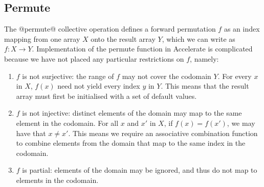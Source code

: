 

\subsection{Permute}
\label{sec:parallel_permute}

The @permute@ collective operation defines a forward permutation $f$ as an
index mapping from one array $X$ onto the result array $Y$, which we can write
as  $f : X \rightarrow Y$. Implementation of the permute function in Accelerate
is complicated because we have not placed any particular restrictions on $f$,
namely:
%
\begin{enumerate}
    \item $f$ is not surjective: the range of $f$ may not cover the codomain
        $Y$. For every $x$ in $X$, $f\left( x \right)$ need not yield every
        index $y$ in $Y$. This means that the result array must first be
        initialised with a set of default values.

    \item $f$ is not injective: distinct elements of the domain may
        map to the same element in the codomain. For all $x$ and $x'$ in $X$, if
        $f\left( x \right) = f\left( x' \right)$, we may have that $x \ne x'$.
        This means we require an associative combination function to combine
        elements from the domain that map to the same index in the codomain.

    \item $f$ is partial: elements of the domain may be ignored, and thus do
        not map to elements in the codomain.
\end{enumerate}


